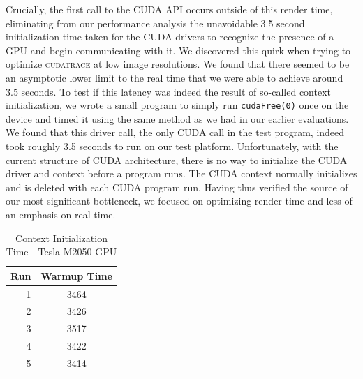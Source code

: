 \documentclass[12pt]{article}
\begin{document}
Crucially, the first call to the CUDA API occurs outside of this render time, eliminating from our performance analysis the unavoidable 3.5 second initialization time taken for the CUDA drivers to recognize the presence of a GPU and begin communicating with it. We discovered this quirk when trying to optimize \textsc{cudatrace} at low image resolutions. We found that there seemed to be an asymptotic lower limit to the real time that we were able to achieve around 3.5 seconds. To test if this latency was indeed the result of so-called context initialization, we wrote a small program to simply run \texttt{cudaFree(0)} once on the device and timed it using the same method as we had in our earlier evaluations. We found that this driver call, the only CUDA call in the test program, indeed took roughly 3.5 seconds to run on our test platform. Unfortunately, with the current structure of CUDA architecture, there is no way to initialize the CUDA driver and context before a program runs. The CUDA context normally initializes and is deleted with each CUDA program run. Having thus verified the source of our most significant bottleneck, we focused on optimizing render time and less of an emphasis on real time.

\begin{table}
    \caption{Context Initialization Time---Tesla M2050 GPU} \label{tab:warmup_time}
    \begin{center}
        \begin{tabular}{r | c}
            \toprule
            Run & Warmup Time \\
            \midrule
            1 & 3464 \\
            2 & 3426 \\
            3 & 3517 \\
            4 & 3422 \\
            5 & 3414 \\
            \bottomrule
        \end{tabular}
    \end{center}
\end{table}
\end{document}
